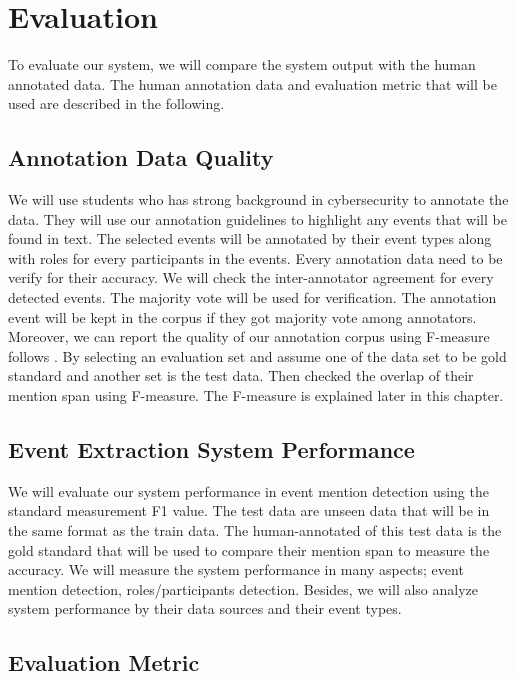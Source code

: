 \chapter{Evaluation}
\thispagestyle{plain}

\label{Chapter5}

To evaluate our system, we will compare the system output with the human annotated data. The human annotation data and evaluation metric that will be used are described in the following.

\section{Annotation Data Quality}
\label{annotation}

We will use students who has strong background in cybersecurity to annotate the data. They will use our annotation guidelines to highlight any events that will be found in text. The selected events will be annotated by their event types along with roles for every participants in the events. Every annotation data need to be verify for their accuracy. We will check the inter-annotator agreement for every detected events. The majority vote will be used for verification. The annotation event will be kept in the corpus if they got majority vote among annotators.\\
\indent Moreover, we can report the quality of our annotation corpus using F-measure follows \cite{mitamura2015event}. By selecting an evaluation set and assume one of the data set to be gold standard and another set is the test data. Then checked the overlap of their mention span using F-measure. The F-measure is explained later in this chapter. 

\section{Event Extraction System Performance}
We will evaluate our system performance in event mention detection using the standard measurement F1 value. The test data are unseen data that will be in the same format as the train data. The human-annotated of this test data is the gold standard that will be used to compare their mention span to measure the accuracy. We will measure the system performance in many aspects; event mention detection, roles/participants detection. Besides, we will also analyze system performance by their data sources and their event types.


\section{Evaluation Metric}
\label{evalmetric}

